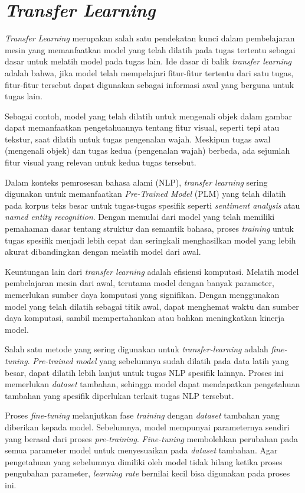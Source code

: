 \section{\textit{Transfer Learning}}

\textit{Transfer Learning} merupakan salah satu pendekatan kunci dalam pembelajaran mesin yang memanfaatkan model yang telah dilatih pada tugas tertentu sebagai dasar untuk melatih model pada tugas lain. Ide dasar di balik \textit{transfer learning} adalah bahwa, jika model telah mempelajari fitur-fitur tertentu dari satu tugas, fitur-fitur tersebut dapat digunakan sebagai informasi awal yang berguna untuk tugas lain.

Sebagai contoh, model yang telah dilatih untuk mengenali objek dalam gambar dapat memanfaatkan pengetahuannya tentang fitur visual, seperti tepi atau tekstur, saat dilatih untuk tugas pengenalan wajah. Meskipun tugas awal (mengenali objek) dan tugas kedua (pengenalan wajah) berbeda, ada sejumlah fitur visual yang relevan untuk kedua tugas tersebut.

Dalam konteks pemrosesan bahasa alami (NLP), \textit{transfer learning} sering digunakan untuk memanfaatkan \textit{Pre-Trained Model} (PLM) yang telah dilatih pada korpus teks besar untuk tugas-tugas spesifik seperti \textit{sentiment analysis} atau \textit{named entity recognition}. Dengan memulai dari model yang telah memiliki pemahaman dasar tentang struktur dan semantik bahasa, proses \textit{training} untuk tugas spesifik menjadi lebih cepat dan seringkali menghasilkan model yang lebih akurat dibandingkan dengan melatih model dari awal.

Keuntungan lain dari \textit{transfer learning} adalah efisiensi komputasi. Melatih model pembelajaran mesin dari awal, terutama model dengan banyak parameter, memerlukan sumber daya komputasi yang signifikan. Dengan menggunakan model yang telah dilatih sebagai titik awal, dapat menghemat waktu dan sumber daya komputasi, sambil mempertahankan atau bahkan meningkatkan kinerja model.

Salah satu metode yang sering digunakan untuk \textit{transfer-learning} adalah \textit{fine-tuning}. \textit{Pre-trained model} yang sebelumnya sudah dilatih pada data latih yang besar, dapat dilatih lebih lanjut untuk tugas NLP spesifik lainnya. Proses ini memerlukan \textit{dataset} tambahan, sehingga model dapat mendapatkan pengetahuan tambahan yang spesifik diperlukan terkait tugas NLP tersebut.

Proses \textit{fine-tuning} melanjutkan fase \textit{training} dengan \textit{dataset} tambahan yang diberikan kepada model. Sebelumnya, model mempunyai parameternya sendiri yang berasal dari proses \textit{pre-training}. \textit{Fine-tuning} membolehkan perubahan pada semua parameter model untuk menyesuaikan pada \textit{dataset} tambahan. Agar pengetahuan yang sebelumnya dimiliki oleh model tidak hilang ketika proses pengubahan parameter, \textit{learning rate} bernilai kecil bisa digunakan pada proses ini.

